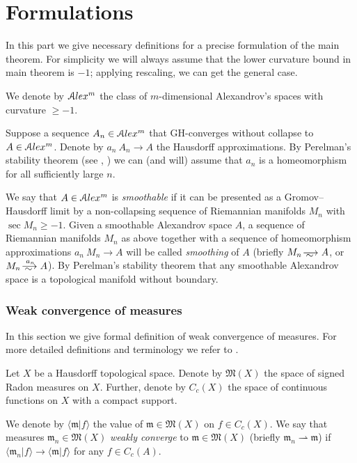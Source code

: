 \part{Formulations}

In this part we give necessary definitions for a precise formulation of the main theorem.
For simplicity  we will always assume that the lower
curvature bound in main theorem is  $-1$;
applying rescaling, we can get the general case.

We denote by
$\mathcal{A}lex^m$ the class of $m$-dimensional Alexandrov's spaces
with curvature $\ge -1$.

Suppose a sequence $A_n\in \mathcal{A}lex^m$ that GH-converges without collapse to 
$A\in \mathcal{A}lex^m$.
Denote by $a_n\:A_n\to A$ the Hausdorff approximations.
By Perelman's stability theorem (see \cite{PerStab}, \cite{KapStab}) we can (and will) assume that $a_n$ is a homeomorphism for all sufficiently large $n$.

We say that $A\in \mathcal{A}lex^m$ is \emph{smoothable}
if it can be presented as a Gromov--Hausdorff limit by a non-collapsing sequence of Riemannian manifolds $M_n$ with $\sec M_n\ge-1$.
Given a smoothable Alexandrov space $A$,
a sequence of Riemannian manifolds $M_n$ as above
together with a sequence of homeomorphism approximations $a_n\:M_n\to A$
will be called \emph{smoothing} of $A$
(briefly $M_n\smooths{} A$, or $M_n\smooths{a_n} A$).
By Perelman's stability theorem that any smoothable Alexandrov space is a topological manifold without boundary.

\section{Weak convergence of measures}

In this section we give formal definition of weak convergence of measures.
For more detailed definitions and terminology we refer to
\cite{GMS}.

Let $X$ be a Hausdorff topological space.
Denote by $\mathfrak M(X)$ the space of signed Radon measures on $X$.
Further, denote by $C_c(X)$  the space of continuous functions on $X$
with a compact support. 

We  denote by $\langle \mathfrak m|f\rangle $ the value of $\mathfrak m\in\mathfrak M(X)$ on $f\in C_c(X)$.
We say that measures $\mathfrak m_n\in \mathfrak M(X)$ \emph{weakly converge} to $\mathfrak m\in \mathfrak M(X)$ (briefly
$\mathfrak m_n\rightharpoonup \mathfrak m$) if $\langle \mathfrak m_n|f\rangle \to \langle \mathfrak m|f\rangle $ for any $f\in C_c(A)$.

